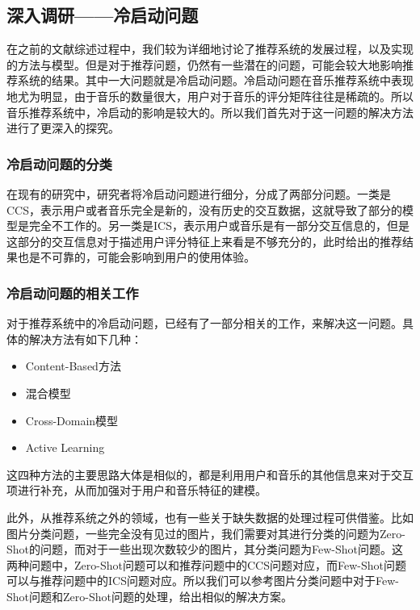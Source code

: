 \subsection{深入调研——冷启动问题}
在之前的文献综述过程中，我们较为详细地讨论了推荐系统的发展过程，以及实现的方法与模型。但是对于推荐问题，仍然有一些潜在的问题，可能会较大地影响推荐系统的结果\cite{currentprob}。其中一大问题就是冷启动问题。冷启动问题在音乐推荐系统中表现地尤为明显，由于音乐的数量很大，用户对于音乐的评分矩阵往往是稀疏的。所以音乐推荐系统中，冷启动的影响是较大的。所以我们首先对于这一问题的解决方法进行了更深入的探究。

\subsubsection{冷启动问题的分类}
在现有的研究中，研究者将冷启动问题进行细分，分成了两部分问题。一类是CCS，表示用户或者音乐完全是新的，没有历史的交互数据，这就导致了部分的模型是完全不工作的。另一类是ICS，表示用户或音乐是有一部分交互信息的，但是这部分的交互信息对于描述用户评分特征上来看是不够充分的，此时给出的推荐结果也是不可靠的，可能会影响到用户的使用体验。

\subsubsection{冷启动问题的相关工作}
对于推荐系统中的冷启动问题，已经有了一部分相关的工作，来解决这一问题。具体的解决方法有如下几种\cite{currentprob}：
\begin{itemize}
    \item Content-Based方法
    \item 混合模型
    \item Cross-Domain模型
    \item Active Learning
\end{itemize}

这四种方法的主要思路大体是相似的，都是利用用户和音乐的其他信息来对于交互项进行补充，从而加强对于用户和音乐特征的建模。

此外，从推荐系统之外的领域，也有一些关于缺失数据的处理过程可供借鉴。比如图片分类问题，一些完全没有见过的图片，我们需要对其进行分类的问题为Zero-Shot的问题，而对于一些出现次数较少的图片，其分类问题为Few-Shot问题。这两种问题中，Zero-Shot问题可以和推荐问题中的CCS问题对应，而Few-Shot问题可以与推荐问题中的ICS问题对应。所以我们可以参考图片分类问题中对于Few-Shot问题和Zero-Shot问题的处理，给出相似的解决方案\cite{currentprob}。

